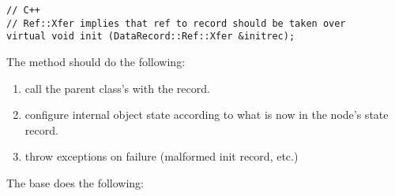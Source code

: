 \documentclass[10pt]{article}
\begin{document}
\begin{verbatim}
// C++
// Ref::Xfer implies that ref to record should be taken over
virtual void init (DataRecord::Ref::Xfer &initrec);
\end{verbatim}
  
  The  method should do the following:
  
  \begin{enumerate}
  
  \item call the parent class's  with the record.
  
  \item configure internal object state according to what is now in the  node's
    state record.
    
  \item throw exceptions on failure (malformed init record, etc.)

  \end{enumerate}

  The base  does the following:
\end{document}
